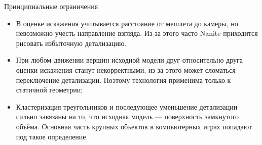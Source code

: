 \documentclass{beamer}
\begin{document}
    \begin{frame}{Принципиальные ограничения}
        \begin{itemize}
            \item
            В оценке искажения учитывается расстояние
            от мешлета до камеры,
            но невозможно учесть направление взгляда.
            Из-за этого часто Nanite приходится
            рисовать избыточную детализацию.

            \item
            При любом движении вершин исходной модели
            друг относительно друга оценки искажения
            станут некорректными, из-за этого
            может сломаться переключение детализации.
            Поэтому технология применима только
            к статичной геометрии;

            \item
            Кластеризация треугольников и последующее уменьшение
            детализации сильно завязаны на то,
            что исходная модель --- поверхность замкнутого объёма.
            Основная часть крупных объектов в компьютерных играх
            попадают под такое определение.
        \end{itemize}
    \end{frame}




\end{document}
